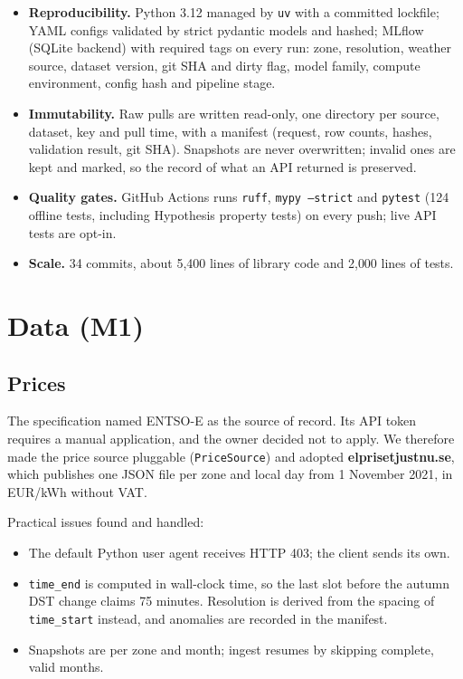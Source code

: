 \documentclass[11pt,a4paper]{article}
\newcommand{\code}[1]{\texttt{#1}}
\begin{document}
\begin{itemize}
\item \textbf{Reproducibility.} Python 3.12 managed by \code{uv} with a committed lockfile; YAML
configs validated by strict pydantic models and hashed; MLflow (SQLite backend) with required
tags on every run: zone, resolution, weather source, dataset version, git SHA and dirty flag,
model family, compute environment, config hash and pipeline stage.
\item \textbf{Immutability.} Raw pulls are written read-only, one directory per source,
dataset, key and pull time, with a manifest (request, row
counts, hashes, validation result, git SHA). Snapshots are never overwritten; invalid ones are kept
and marked, so the record of what an API returned is preserved.
\item \textbf{Quality gates.} GitHub Actions runs \code{ruff}, \code{mypy --strict} and
\code{pytest} (124 offline tests, including Hypothesis property tests) on every push; live API
tests are opt-in.
\item \textbf{Scale.} 34 commits, about 5{,}400 lines of library code and 2{,}000 lines of tests.
\end{itemize}

\section{Data (M1)}

\subsection{Prices}
The specification named ENTSO-E as the source of record. Its API token requires a manual
application, and the owner decided not to apply. We therefore made the price source pluggable
(\code{PriceSource}) and adopted \textbf{elprisetjustnu.se}, which publishes one JSON file per
zone and local day from 1 November 2021, in EUR/kWh without VAT.

Practical issues found and handled:
\begin{itemize}
\item The default Python user agent receives HTTP 403; the client sends its own.
\item \code{time\_end} is computed in wall-clock time, so the last slot before the autumn DST
change claims 75 minutes. Resolution is derived from the spacing of \code{time\_start} instead,
and anomalies are recorded in the manifest.
\item Snapshots are per zone and month; ingest resumes by skipping complete, valid months.
\end{itemize}
\end{document}
